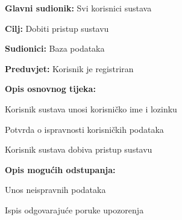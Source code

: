 					\noindent {}
				\begin{packed_item}
					
					\item \textbf{Glavni sudionik: } Svi korisnici sustava
					\item  \textbf{Cilj:} Dobiti pristup sustavu
					\item  \textbf{Sudionici:} Baza podataka
					\item  \textbf{Preduvjet:} Korisnik je registriran
					\item  \textbf{Opis osnovnog tijeka:}
					
					\item[] \begin{packed_enum}
						
						\item Korisnik sustava unosi korisničko ime i lozinku
						\item Potvrda o ispravnosti korisničkih podataka
						\item Korisnik sustava dobiva pristup sustavu
						
					\end{packed_enum}
					
					\item  \textbf{Opis mogućih odstupanja:}
					
					\item[] \begin{packed_item}
						
						\item[2.a] Unos neispravnih podataka
						\item[] \begin{packed_enum}
							
							\item Ispis odgovarajuće poruke upozorenja 
							
							
						\end{packed_enum}
						
						
					\end{packed_item}
				\end{packed_item}
			

